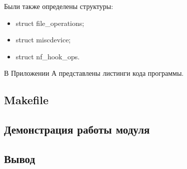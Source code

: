 %
Были также определены структуры:
%
\begin{itemize}
	\item struct file\_operations;
	
	\item struct miscdevice;
	
	\item struct nf\_hook\_ops. \newline
\end{itemize}
%
В Приложении А представлены листинги кода программы. \newline
%
\subsection{Makefile}

\subsection{Демонстрация работы модуля}

\subsection{Вывод}